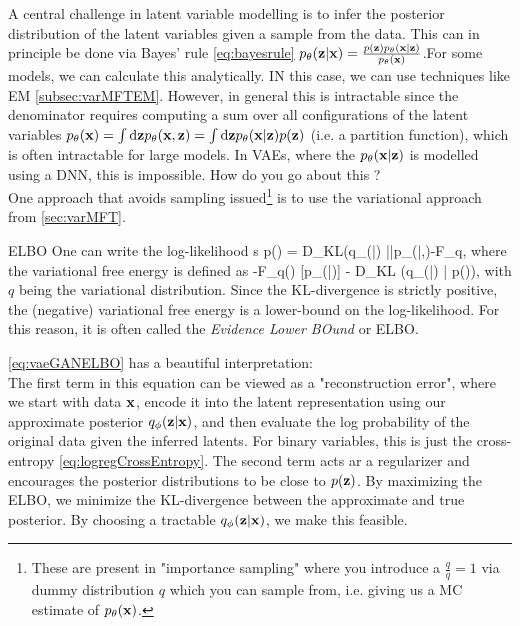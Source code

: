  A central challenge in latent variable modelling is to infer the posterior distribution of the latent variables given a sample from the data. This can in principle be done via Bayes' rule \ref{eq:bayesrule} $p_\theta(\mathbf{z}|\mathbf{x}) = \frac{p(\mathbf{z}) p_\theta(\mathbf{x} |\mathbf{z})}{p_\theta(\mathbf{x})}$.For some models, we can calculate this analytically. IN this case, we can use techniques like EM \ref{subsec:varMFTEM}.  However, in general this is intractable since the denominator requires computing a sum over all configurations of the latent variables $p_\theta(\mathbf{x}) = \int \mathrm{d} \mathbf{z} p_\theta(\mathbf{x},\mathbf{z})=\int \mathrm{d} \mathbf{z} p_\theta(\mathbf{x} |\mathbf{z}) p(\mathbf{z})$ (i.e. a partition function), which is often intractable for large models. In VAEs, where the $p_\theta(\mathbf{x} |\mathbf{z})$ is modelled using a DNN, this is impossible. How do you go about this ?\\
 One approach that avoids sampling issued\footnote{These are present in "importance sampling" where you introduce a $\frac{q}{q}=1$ via dummy distribution $q$ which you can sample from, i.e. giving us a MC estimate of $p_\theta(\mathbf{x})$.} is to use the variational approach from \ref{sec:varMFT}.
 \begin{mybox}{ELBO}
One can write the log-likelihood s
 	\be 
 	\log p(\mx) = D_{KL}(q_\theta(\mz|\mx) ||p_\theta(\mz|\mx,\mt)-F_{q\phi},
 	\ee 
 	where the variational free energy is defined as 
 	\be 
 	\label{eq:vaeGANELBO}
 	-F_{q\phi}(\mx) \equiv {}[\log p_\theta(\mx |\mz)] - D_{KL} (q_\phi (\mz |\mx) | p(\mz)),
 	\ee 
 	with $q$ being the variational distribution. Since the KL-divergence is strictly positive, the (negative) variational free energy is a lower-bound on the log-likelihood. For this reason, it is often called the \emph{Evidence Lower BOund} or ELBO.
 	
 \end{mybox}
\ref{eq:vaeGANELBO} has a beautiful interpretation:\\
The first term in this equation can be viewed as a "reconstruction error", where we start with data $\mathbf{x}$, encode it into the latent representation using our approximate posterior $q_{\phi}(\mathbf{z} |\mathbf{x})$, and then evaluate the log probability of the original data given the inferred latents. For binary variables, this is just the cross-entropy \ref{eq:logregCrossEntropy}. The second term acts ar a regularizer and encourages the posterior distributions to be close to $p(\mathbf{z})$. By maximizing the ELBO, we minimize the KL-divergence between the approximate and true posterior. By choosing a tractable $q_\phi(\mathbf{z}|\mathbf{x})$, we make this feasible.

